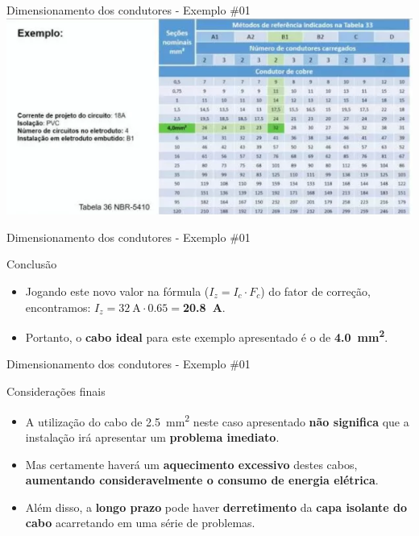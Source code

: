 
\begin{frame}{Dimensionamento dos condutores - Exemplo \#01}
	\centering
	\includegraphics[width=1\linewidth]{Figuras/Ch06/fig7}
\end{frame}


\begin{frame}{Dimensionamento dos condutores - Exemplo \#01}
	\begin{block}{Conclusão}
		\begin{itemize}
			\item Jogando este novo valor na fórmula ($ I_z = I_c\cdot F_c $) do fator de correção, encontramos: $ I_z= \SI{32}{\ampere}\cdot \num{0,65}=$\textbf{\SI{20.8}{\ampere}}.
			\item Portanto, o \textbf{cabo ideal }para este exemplo apresentado é o de \textbf{\SI{4.0}{\milli\meter\squared}}.
		\end{itemize}

	\end{block}
\end{frame}


\begin{frame}{Dimensionamento dos condutores - Exemplo \#01}
	\begin{block}{Considerações finais}
		\begin{itemize}
			\item A utilização do cabo de \SI{2,5}{\milli\meter\squared} neste caso apresentado \textbf{não significa} que a instalação irá apresentar um \textbf{problema imediato}.
			\item Mas certamente haverá um \textbf{aquecimento excessivo} destes cabos, \textbf{aumentando consideravelmente o consumo de energia elétrica}.
			\item Além disso, a \textbf{longo prazo} pode haver \textbf{derretimento} da \textbf{capa isolante do cabo} acarretando em uma série de problemas.
		\end{itemize}
	\end{block}
\end{frame}


